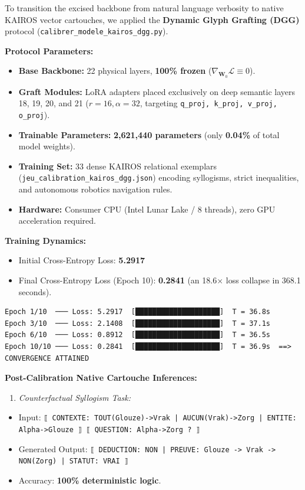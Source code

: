 \documentclass[10pt,twocolumn]{article}
\begin{document}
To transition the excised backbone from natural language verbosity to native KAIROS vector cartouches, we applied the \textbf{Dynamic Glyph Grafting (DGG)} protocol (\texttt{calibrer_modele_kairos_dgg.py}).

\textbf{Protocol Parameters:}
\begin{itemize}
  \item \textbf{Base Backbone:} 22 physical layers, \textbf{100\% frozen} ($\nabla_{\mathbf{W}_0} \mathcal{L} \equiv 0$).
  \item \textbf{Graft Modules:} LoRA adapters placed exclusively on deep semantic layers 18, 19, 20, and 21 ($r=16, \alpha=32$, targeting \texttt{q_proj, k_proj, v_proj, o_proj}).
  \item \textbf{Trainable Parameters:} \textbf{2,621,440 parameters} (only \textbf{0.04\%} of total model weights).
  \item \textbf{Training Set:} 33 dense KAIROS relational exemplars (\texttt{jeu_calibration_kairos_dgg.json}) encoding syllogisms, strict inequalities, and autonomous robotics navigation rules.
  \item \textbf{Hardware:} Consumer CPU (Intel Lunar Lake / 8 threads), zero GPU acceleration required.
\end{itemize}

\textbf{Training Dynamics:}
\begin{itemize}
  \item Initial Cross-Entropy Loss: \textbf{5.2917}
  \item Final Cross-Entropy Loss (Epoch 10): \textbf{0.2841} (an 18.6× loss collapse in 368.1 seconds).
\end{itemize}

\begin{verbatim}
Epoch 1/10  ─── Loss: 5.2917  [████████████████████]  T = 36.8s
Epoch 3/10  ─── Loss: 2.1408  [████████████████████]  T = 37.1s
Epoch 6/10  ─── Loss: 0.8912  [████████████████████]  T = 36.5s
Epoch 10/10 ─── Loss: 0.2841  [████████████████████]  T = 36.9s  ==> CONVERGENCE ATTAINED
\end{verbatim}

\textbf{Post-Calibration Native Cartouche Inferences:}

\begin{enumerate}
  \item \textit{Counterfactual Syllogism Task:}
\end{enumerate}
\begin{itemize}
  \item Input: \texttt{⟦ CONTEXTE: TOUT(Glouze)->Vrak | AUCUN(Vrak)->Zorg | ENTITE: Alpha->Glouze ⟧ ⟦ QUESTION: Alpha->Zorg ? ⟧}
  \item Generated Output: \texttt{⟦ DEDUCTION: NON | PREUVE: Glouze -> Vrak -> NON(Zorg) | STATUT: VRAI ⟧}
  \item Accuracy: \textbf{100\% deterministic logic}.
\end{itemize}
\end{document}
